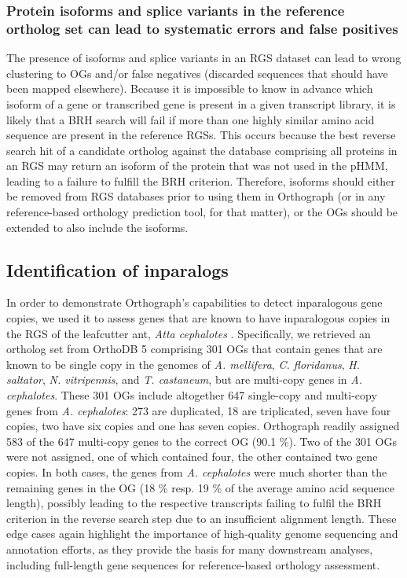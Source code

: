 \subsubsection{Protein isoforms and splice variants in the reference
ortholog set can lead to systematic errors and false
positives}\label{protein-isoforms-and-splice-variants-in-the-reference-ortholog-set-can-lead-to-systematic-errors-and-false-positives}

The presence of isoforms and splice variants in an RGS dataset can lead
to wrong clustering to OGs and/or false negatives (discarded sequences
that should have been mapped elsewhere). Because it is impossible to
know in advance which isoform of a gene or transcribed gene is present
in a given transcript library, it is likely that a BRH search will fail
if more than one highly similar amino acid sequence are present in the
reference RGSs. This occurs because the best reverse search hit of a
candidate ortholog against the database comprising all proteins in an
RGS may return an isoform of the protein that was not used in the pHMM,
leading to a failure to fulfill the BRH criterion. Therefore, isoforms
should either be removed from RGS databases prior to using them in
Orthograph (or in any reference-based orthology prediction tool, for
that matter), or the OGs should be extended to also include the
isoforms.

\subsection{Identification of
inparalogs}\label{identification-of-inparalogs}

In order to demonstrate Orthograph's capabilities to detect inparalogous
gene copies, we used it to assess genes that are known to have
inparalogous copies in the RGS of the leafcutter ant, \emph{Atta
cephalotes} \cite{Suen2011}. Specifically, we retrieved an ortholog set
from OrthoDB 5 comprising 301 OGs that contain genes that are known to
be single copy in the genomes of \emph{A. mellifera}, \emph{C.
floridanus}, \emph{H. saltator}, \emph{N. vitripennis}, and \emph{T.
castaneum}, but are multi-copy genes in \emph{A. cephalotes}. These 301
OGs include altogether 647 single-copy and multi-copy genes from
\emph{A. cephalotes}: 273 are duplicated, 18 are triplicated, seven have
four copies, two have six copies and one has seven copies. Orthograph
readily assigned 583 of the 647 multi-copy genes to the correct OG (90.1
\%). Two of the 301 OGs were not assigned, one of which contained four,
the other contained two gene copies. In both cases, the genes from
\emph{A. cephalotes} were much shorter than the remaining genes in the
OG (18 \% resp. 19 \% of the average amino acid sequence length),
possibly leading to the respective transcripts failing to fulfil the BRH
criterion in the reverse search step due to an insufficient alignment
length. These edge cases again highlight the importance of high-quality
genome sequencing and annotation efforts, as they provide the basis for
many downstream analyses, including full-length gene sequences for
reference-based orthology assessment.

